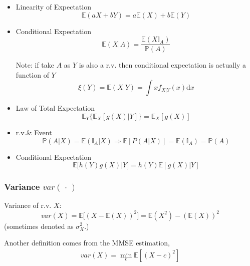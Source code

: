 \begin{itemize}
    \item Linearity of Expectation\begin{equation}
        \mathbb{E}(aX+bY)=a \mathbb{E}(X)+b\mathbb{E}(Y)
    \end{equation}
    \item Conditional Expectation\begin{equation}
        \mathbb{E}(X|A)=\frac{\mathbb{E}(X\mathbb{I}_A)}{\mathbb{P}(A)}
    \end{equation}
    
    Note: if take $A$ as $Y$ is also a r.v. then conditional expectation is actually a function of $Y$
    \begin{equation}\xi (Y)=\mathbb{E}(X|Y)=\int xf_{X|Y}(x)\mathrm{d}x\end{equation}

    

    \item Law of Total Expectation\begin{equation}
        \mathbb{E}_Y\big\{\mathbb{E}_X[g(X)|Y]\big\}=\mathbb{E}_X[g(X)]
    \end{equation}
    \item r.v.\& Event
    \begin{equation}
        \mathbb{P}(A|X)=\mathbb{E}(\mathbb{I}_A|X)\Rightarrow \mathbb{E}[P(A|X)]=\mathbb{E}(\mathbb{I}_A)=\mathbb{P}(A)
    \end{equation}
    \item Conditional Expectation
    \begin{equation}
        \mathbb{E}\big[h(Y)g(X)|Y\big]=h(Y)\mathbb{E}[g(X)|Y]
    \end{equation}
\end{itemize}


\subsubsection{Variance $ var(\, \cdot \, ) $}
    Variance of r.v. $X$: 
    \begin{equation}
        var(X)=\mathbb{E}\big[(X-\mathbb{E}(X))^2\big]=\mathbb{E}(X^2)-(\mathbb{E}(X))^2
    \end{equation}
    (sometimes denoted as $\sigma^2_X$.)

    Another definition comes from the MMSE estimation, 
    \begin{align}
        var(X)=\mathop{\min}\limits_{c}\mathbb{E}\left[ (X-c)^2 \right]   
    \end{align}
    
